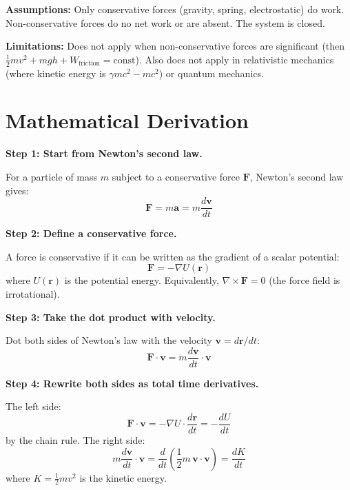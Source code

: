 \documentclass[11pt,openright]{book}
\begin{document}
\textbf{Assumptions:} Only conservative forces (gravity, spring, electrostatic) do work. Non-conservative forces do no net work or are absent. The system is closed.


\textbf{Limitations:} Does not apply when non-conservative forces are significant (then $\frac{1}{2}mv^2 + mgh + W_{\text{friction}} = \text{const}$). Also does not apply in relativistic mechanics (where kinetic energy is $\gamma mc^2 - mc^2$) or quantum mechanics.


\section*{Mathematical Derivation}

\textbf{Step 1: Start from Newton's second law.}

For a particle of mass $m$ subject to a conservative force $\mathbf{F}$, Newton's second law gives:
\begin{equation}
\mathbf{F} = m\mathbf{a} = m\frac{d\mathbf{v}}{dt}
\end{equation}

\textbf{Step 2: Define a conservative force.}

A force is conservative if it can be written as the gradient of a scalar potential:
\begin{equation}
\mathbf{F} = -\nabla U(\mathbf{r})
\end{equation}
where $U(\mathbf{r})$ is the potential energy. Equivalently, $\nabla \times \mathbf{F} = 0$ (the force field is irrotational).

\textbf{Step 3: Take the dot product with velocity.}

Dot both sides of Newton's law with the velocity $\mathbf{v} = d\mathbf{r}/dt$:
\begin{equation}
\mathbf{F} \cdot \mathbf{v} = m\frac{d\mathbf{v}}{dt} \cdot \mathbf{v}
\end{equation}

\textbf{Step 4: Rewrite both sides as total time derivatives.}

The left side:
\begin{equation}
\mathbf{F} \cdot \mathbf{v} = -\nabla U \cdot \frac{d\mathbf{r}}{dt} = -\frac{dU}{dt}
\end{equation}
by the chain rule. The right side:
\begin{equation}
m\frac{d\mathbf{v}}{dt} \cdot \mathbf{v} = \frac{d}{dt}\left(\frac{1}{2}m\,\mathbf{v} \cdot \mathbf{v}\right) = \frac{dK}{dt}
\end{equation}
where $K = \frac{1}{2}mv^2$ is the kinetic energy.
\end{document}
